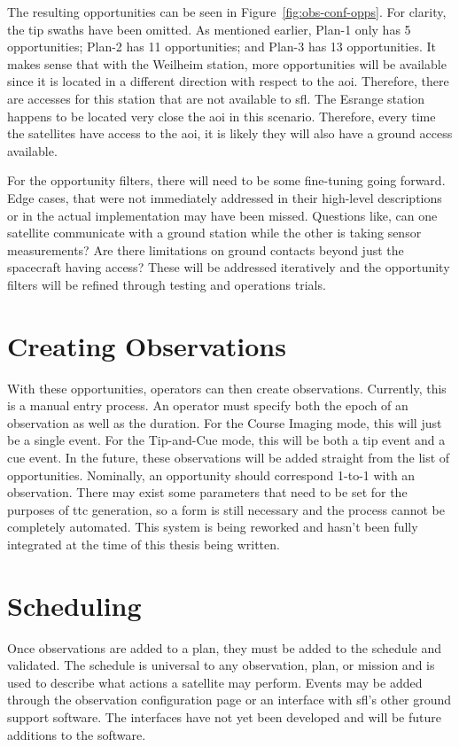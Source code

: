 The resulting opportunities can be seen in Figure~\ref{fig:obs-conf-opps}.  For
clarity, the tip swaths have been omitted. As mentioned earlier, Plan-1 only
has 5 opportunities; Plan-2 has 11 opportunities; and Plan-3 has 13
opportunities. It makes sense that with the Weilheim station, more
opportunities will be available since it is located in a different direction
with respect to the \gls{aoi}. Therefore, there are accesses for this station
that are not available to \gls{sfl}. The Esrange station happens to be located
very close the \gls{aoi} in this scenario. Therefore, every time the satellites
have access to the \gls{aoi}, it is likely they will also have a ground access
available. 


For the opportunity filters, there will need to be some fine-tuning going
forward. Edge cases, that were not immediately addressed in their high-level
descriptions or in the actual implementation may have been missed. Questions
like, can one satellite communicate with a ground station while the other is
taking sensor measurements? Are there limitations on ground contacts beyond
just the spacecraft having access? These will be addressed iteratively and the
opportunity filters will be refined through testing and operations
trials.

\section{Creating Observations}

With these opportunities, operators can then create observations. Currently,
this is a manual entry process. An operator must specify both the epoch of an
observation as well as the duration. For the Course Imaging mode, this will
just be a single event. For the Tip-and-Cue mode, this will be both a tip event
and a cue event. In the future, these observations will be added straight from
the list of opportunities. Nominally, an opportunity should correspond 1-to-1
with an observation. There may exist some parameters that need to be set for
the purposes of \gls{ttc} generation, so a form is still necessary and the
process cannot be completely automated. This system is being reworked and
hasn't been fully integrated at the time of this thesis being written.


\section{Scheduling}


Once observations are added to a plan, they must be added to the schedule and
validated. The schedule is universal to any observation, plan, or mission and
is used to describe what actions a satellite may perform. Events may be added
through the observation configuration page or an interface with \gls{sfl}’s
other ground support software. The interfaces have not yet been developed and
will be future additions to the software.

